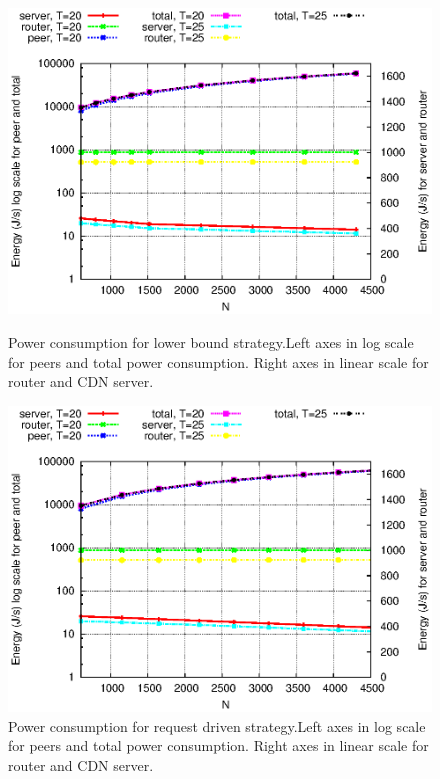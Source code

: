 \documentclass[conference]{IEEEtran}
\begin{document}
\begin{figure}[htp!]
\centering
\begin{minipage}[b]{0.4\linewidth}
	\includegraphics[scale=0.45]{graphs/lw-energy.eps}
	\caption{Power consumption for lower bound strategy.Left axes in log scale for peers and total power consumption. Right axes in linear scale for router and CDN server.}
	\label{fig:lw-energy}
\end{minipage}
\hfill
\centering
\begin{minipage}[b]{0.4\linewidth}
	\includegraphics[scale=0.45]{graphs/req-energy.eps}
	\caption{Power consumption for request driven strategy.Left axes in log scale for peers and total power consumption. Right axes in linear scale for router and CDN server.}
	\label{fig:req-energy}
\end{minipage}

\end{figure}
\end{document}
